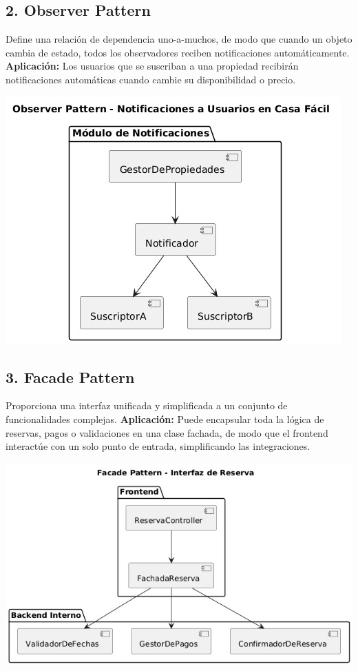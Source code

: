 	\subsection*{2. Observer Pattern}
		\noindent Define una relación de dependencia uno-a-muchos, de modo que cuando un objeto cambia de estado, todos los observadores reciben notificaciones automáticamente.  
		\textbf{Aplicación:} Los usuarios que se suscriban a una propiedad recibirán notificaciones automáticas cuando cambie su disponibilidad o precio.
		\begin{center}
			\includegraphics[width=\linewidth]{figures/patterns/observe.jpg}
			\label{fig:img10}
		\end{center}
	
	\subsection*{3. Facade Pattern}
		\noindent Proporciona una interfaz unificada y simplificada a un conjunto de funcionalidades complejas.  
		\textbf{Aplicación:} Puede encapsular toda la lógica de reservas, pagos o validaciones en una clase fachada, de modo que el frontend interactúe con un solo punto de entrada, simplificando las integraciones.
		\begin{center}
			\includegraphics[width=\linewidth]{figures/patterns/facade.jpg}
			\label{fig:img11}
		\end{center}
	
